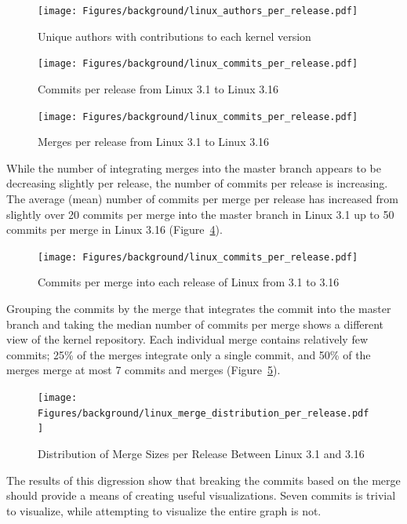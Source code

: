 \begin{figure}[htpb]
  \centering
  \texttt{[image: Figures/background/linux\_authors\_per\_release.pdf]}
  \caption{Unique authors with contributions to each kernel version}
  \label{fig:linux_authors_per_release}
\end{figure}

\begin{figure}[htpb]
  \centering
  \texttt{[image: Figures/background/linux\_commits\_per\_release.pdf]}
  \caption{Commits per release from Linux 3.1 to Linux 3.16}
  \label{fig:linux_commits_per_release}
\end{figure}

\begin{figure}[htpb]
  \centering
  \texttt{[image: Figures/background/linux\_commits\_per\_release.pdf]}
  \caption{Merges per release from Linux 3.1 to Linux 3.16}
  \label{fig:linux_merges_per_release}
\end{figure}

While the number of integrating merges into the master branch appears to
be decreasing slightly per release, the number of commits per release is
increasing.
The average (mean) number of commits per merge per release has
increased from slightly over 20 commits per merge into the master branch
in Linux 3.1 up to 50 commits per merge in Linux 3.16
(Figure~\ref{fig:linux_commits_per_merge_per_release}).

\begin{figure}[htpb]
  \centering
  \texttt{[image: Figures/background/linux\_commits\_per\_release.pdf]}
  \caption{Commits per merge into each release of Linux from 3.1 to 3.16}
  \label{fig:linux_commits_per_merge_per_release}
\end{figure}

Grouping the commits by the merge that integrates the commit into the
master branch and taking the median number of commits per merge shows a
different view of the kernel repository.
Each individual merge contains relatively few commits; 25\% of the
merges integrate only a single commit, and 50\% of the merges merge
at most 7 commits and merges
(Figure~\ref{fig:linux_merge_distribution_per_release}).

\begin{figure}[htpb]
  \centering
  \texttt{[image: Figures/background/linux\_merge\_distribution\_per\_release.pdf]}
  \caption{Distribution of Merge Sizes per Release Between Linux 3.1 and
  3.16}
  \label{fig:linux_merge_distribution_per_release}
\end{figure}

The results of this digression show that breaking the commits based on
the merge should provide a means of creating useful visualizations.
Seven commits is trivial to visualize, while attempting to visualize the
entire graph is not.
